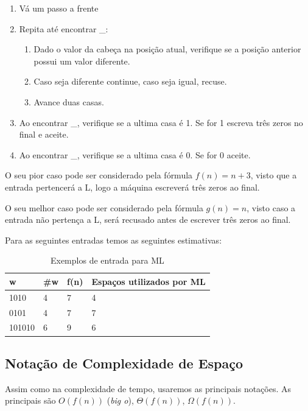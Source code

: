 \documentclass[submission,copyright,creativecommons]{eptcs}
\begin{document}
\begin{enumerate}
    \item Vá um passo a frente
    \item Repita até encontrar \_:
          \begin{enumerate}
              \item Dado o valor da cabeça na posição atual, verifique se a posição anterior possui um valor diferente.
              \item Caso seja diferente continue, caso seja igual, recuse.
              \item Avance duas casas.
          \end{enumerate}
    \item Ao encontrar \_, verifique se a ultima casa é 1. Se for 1 escreva três zeros no final e aceite.
    \item Ao encontrar \_, verifique se a ultima casa é 0. Se for 0 aceite.
\end{enumerate}

O seu pior caso pode ser considerado pela fórmula $f(n)=n+3$, visto que a entrada pertencerá a L, logo a máquina escreverá três zeros ao final.

O seu melhor caso pode ser considerado pela fórmula $g(n)=n$, visto caso a entrada não pertença a L, será recusado antes de escrever três zeros ao final.

Para as seguintes entradas temos as seguintes estimativas:

\begin{table}[!ht]
\centering
\caption{Exemplos de entrada para ML}
\label{my-label}
\begin{tabular}{|l|l|l|l|}
\hline
w & \#w & f(n) & Espaços utilizados por ML \\ \hline
1010   & 4 & 7  & 4 \\ \hline
0101   & 4 & 7  & 7 \\ \hline
101010 & 6 & 9  & 6 \\ \hline
\end{tabular}
\end{table}

\subsection{Notação de Complexidade de Espaço}

Assim como na complexidade de tempo, usaremos as principais notações. As principais são\cite{usp} $O(f(n))$ (\textit{big o}), $\Theta(f(n))$, $\Omega(f(n))$.
\end{document}
